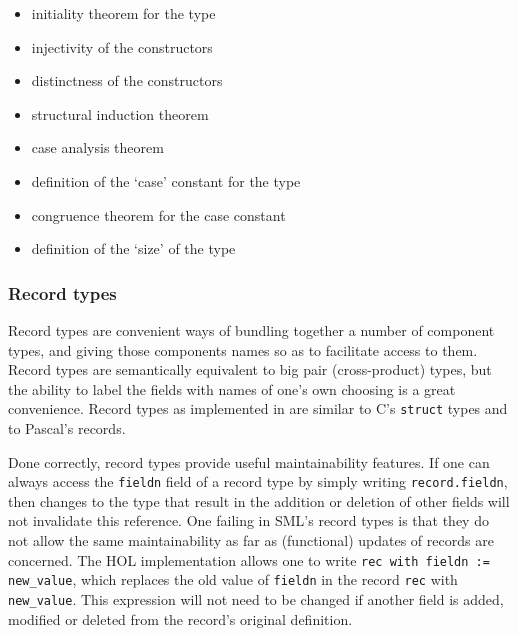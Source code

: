 \begin{itemize}
\item initiality theorem for the type
\item injectivity of the constructors
\item distinctness of the constructors
\item structural induction theorem
\item case analysis theorem
\item definition of the `case' constant for the type
\item congruence theorem for the case constant
\item definition of the `size' of the type
\end{itemize}


\subsubsection{Record types}

Record types are convenient ways of bundling together a number of
component types, and giving those components names so as to facilitate
access to them.  Record types are semantically equivalent to big pair
(cross-product) types, but the ability to label the fields with names
of one's own choosing is a great convenience.  Record types as
implemented in \holn{} are similar to C's {\tt struct} types and to
Pascal's records.

Done correctly, record types provide useful maintainability features.
If one can always access the {\tt fieldn} field of a record type by
simply writing {\tt record.fieldn}, then changes to the type that
result in the addition or deletion of other fields will not invalidate
this reference.  One failing in SML's record types is that they do not
allow the same maintainability as far as (functional) updates of
records are concerned.  The HOL implementation allows one to write
{\tt rec with fieldn := new\_value}, which replaces the old value of
{\tt fieldn} in the record {\tt rec} with {\tt new\_value}.  This
expression will not need to be changed if another field is added,
modified or deleted from the record's original definition.

